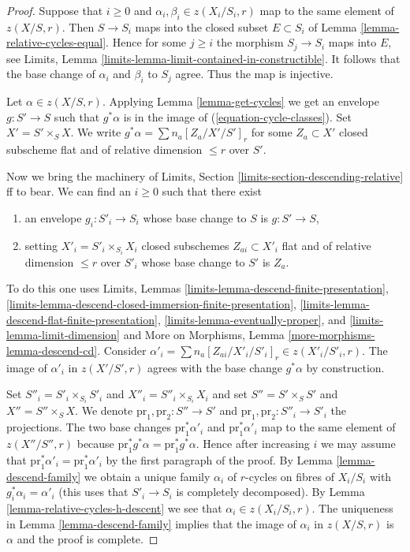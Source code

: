 \begin{proof}
Suppose that $i \geq 0$ and $\alpha_i, \beta_i \in z(X_i/S_i, r)$
map to the same element of $z(X/S, r)$. Then $S \to S_i$
maps into the closed subset $E \subset S_i$ of
Lemma \ref{lemma-relative-cycles-equal}.
Hence for some $j \geq i$ the morphism $S_j \to S_i$
maps into $E$, see Limits, Lemma
\ref{limits-lemma-limit-contained-in-constructible}.
It follows that the base change of
$\alpha_i$ and $\beta_i$ to $S_j$ agree. Thus the map is injective.

\medskip\noindent
Let $\alpha \in z(X/S, r)$. Applying Lemma \ref{lemma-get-cycles}
we get an envelope $g : S' \to S$ such that $g^*\alpha$
is in the image of (\ref{equation-cycle-classes}).
Set $X' = S' \times_S X$. We write $g^*\alpha = \sum n_a [Z_a/X'/S']_r$
for some $Z_a \subset X'$ closed subscheme
flat and of relative dimension $\leq r$ over $S'$.

\medskip\noindent
Now we bring the machinery of
Limits, Section \ref{limits-section-descending-relative} ff to bear.
We can find an $i \geq 0$ such that there exist
\begin{enumerate}
\item an envelope $g_i : S'_i \to S_i$
whose base change to $S$ is $g : S' \to S$,
\item setting $X'_i = S'_i \times_{S_i} X_i$
closed subschemes $Z_{ai} \subset X'_i$ flat and of
relative dimension $\leq r$ over $S'_i$ whose base change to $S'$
is $Z_a$.
\end{enumerate}
To do this one uses Limits, Lemmas
\ref{limits-lemma-descend-finite-presentation},
\ref{limits-lemma-descend-closed-immersion-finite-presentation},
\ref{limits-lemma-descend-flat-finite-presentation},
\ref{limits-lemma-eventually-proper}, and
\ref{limits-lemma-limit-dimension}
and More on Morphisms, Lemma
\ref{more-morphisms-lemma-descend-cd}.
Consider
$\alpha'_i = \sum n_a [Z_{ai}/X'_i/S'_i]_r \in z(X'_i/S'_i, r)$.
The image of $\alpha'_i$ in $z(X'/S', r)$ agrees with the base change
$g^*\alpha$ by construction.

\medskip\noindent
Set $S''_i = S'_i \times_{S_i} S'_i$ and $X''_i = S''_i \times_{S_i} X_i$
and set $S'' = S' \times_S S'$ and $X'' = S'' \times_S X$.
We denote $\text{pr}_1, \text{pr}_2 : S'' \to S'$ and
$\text{pr}_1, \text{pr}_2 : S''_i \to S'_i$ the projections.
The two base changes $\text{pr}_1^*\alpha'_i$ and $\text{pr}_1^*\alpha'_i$
map to the same element of $z(X''/S'', r)$ because
$\text{pr}_1^*g^*\alpha = \text{pr}_1^*g^*\alpha$.
Hence after increasing $i$ we may assume that
$\text{pr}_1^*\alpha'_i = \text{pr}_1^*\alpha'_i$
by the first paragraph of the proof.
By Lemma \ref{lemma-descend-family}
we obtain a unique family $\alpha_i$
of $r$-cycles on fibres of $X_i/S_i$
with $g_i^*\alpha_i = \alpha'_i$ (this uses that $S'_i \to S_i$
is completely decomposed).
By Lemma \ref{lemma-relative-cycles-h-descent}
we see that $\alpha_i \in z(X_i/S_i, r)$.
The uniqueness in Lemma \ref{lemma-descend-family} implies that the
image of $\alpha_i$ in $z(X/S, r)$ is $\alpha$ and the proof is complete.
\end{proof}

